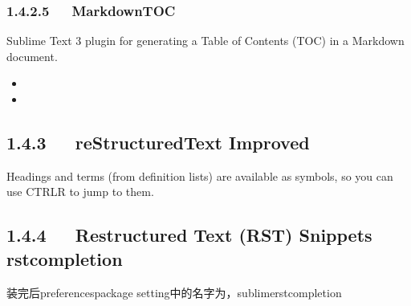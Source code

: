 \documentclass[letterpaper,12pt,english]{sphinxmanual}
\begin{document}
\subsubsection{1.4.2.5   MarkdownTOC}
\label{\detokenize{001software/001install/sublime:markdowntoc}}
Sublime Text 3 plugin for generating a Table of Contents (TOC) in a
Markdown document.
\begin{itemize}
\item {} 

\item {} 

\end{itemize}


\subsection{1.4.3   reStructuredText Improved}
\label{\detokenize{001software/001install/sublime:restructuredtext-improved}}
Headings and terms (from definition lists) are available as symbols, so
you can use CTRL\sphinxhyphen{}R to jump to them.


\subsection{1.4.4   Restructured Text (RST) Snippets rst\sphinxhyphen{}completion}
\label{\detokenize{001software/001install/sublime:restructured-text-rst-snippets-rst-completion}}
装完后preferences\sphinxhyphen{}package setting中的名字为，sublime\sphinxhyphen{}rst\sphinxhyphen{}completion
\end{document}
